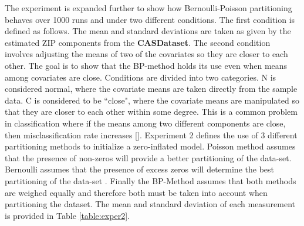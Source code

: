 \documentclass[11pt,letterpaper]{article}
\numberwithin{equation}{section}
\numberwithin{equation}{section}
\numberwithin{equation}{section}
\begin{document}
The experiment is expanded further to show how Bernoulli-Poisson partitioning behaves over 1000 runs and under two different conditions. The first condition is defined as follows. The mean and standard deviations are taken as given by the estimated  ZIP components from the \textbf{CASDataset}. The second condition involves adjusting the means of two of the covariates so they are closer to each other. The goal is to show that the BP-method holds its use even when means among covariates are close.  Conditions are divided into two categories. N is considered normal, where the covariate means are taken directly from the sample data. C is considered to be ``close", where the covariate means are manipulated so that they are closer to each other within some degree. This is a common problem in classification where if the means among two different components are close, then misclassification rate increases [\cite{LimHwa}]. Experiment 2 defines the use of 3 different partitioning methods to initialize a zero-inflated model. Poisson method assumes that the presence of non-zeros will provide a better partitioning of the data-set. Bernoulli assumes that the presence of excess zeros will determine the best partitioning of the data-set . Finally the BP-Method assumes that both methods are weighed equally and therefore both must be taken into account when partitioning the dataset. The mean and standard deviation of each measurement is provided in Table \ref{table:exper2}.
\end{document}
